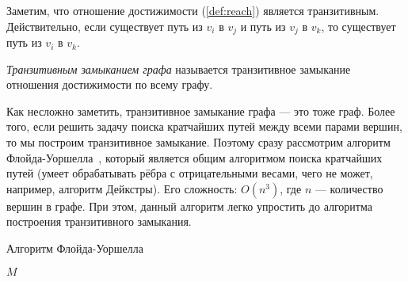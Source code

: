 Заметим, что отношение достижимости (\ref{def:reach}) является транзитивным.
Действительно, если существует путь из $v_i$ в $v_j$ и путь из $v_j$ в $v_k$, то существует путь из $v_i$ в $v_k$.

\begin{definition}
  \textit{Транзитивным замыканием графа} называется транзитивное замыкание отношения достижимости по всему графу.
\end{definition}

Как несложно заметить, транзитивное замыкание графа --- это тоже граф.
Более того, если решить задачу поиска кратчайших путей между всеми парами вершин, то мы построим транзитивное замыкание.
Поэтому сразу рассмотрим алгоритм Флойда-Уоршелла~\cite{Floyd1962, Bernard1959, Warshall1962}, который является общим алгоритмом поиска кратчайших путей (умеет обрабатывать рёбра с отрицательными весами, чего не может, например, алгоритм Дейкстры). Его сложность: $O(n^3)$, где $n$ --- количество вершин в графе.
При этом, данный алгоритм легко упростить до алгоритма построения транзитивного замыкания.

\begin{algorithm}
\begin{algorithmic}[1]
\caption{Алгоритм Флойда-Уоршелла}
\label{lst:algoFloydWarxhall}
        \EndFor
      \EndFor
    \EndFor
\State \Return $M$
\EndFunction
\end{algorithmic}
\end{algorithm}



